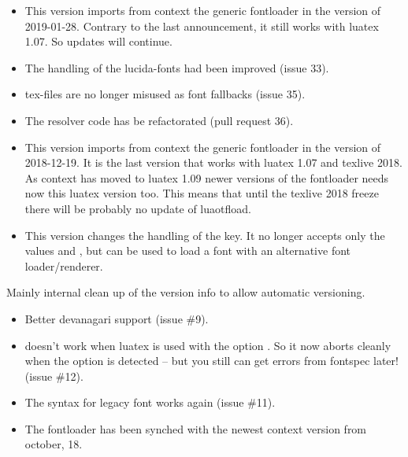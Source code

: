 \begin{itemize}
\item
This version imports from context the generic fontloader in the version of 2019-01-28. Contrary to the last announcement, it still works with luatex 1.07. So updates will continue.

\item The handling of the lucida-fonts had been improved (issue 33).

\item tex-files are no longer misused as font fallbacks (issue 35).

\item The resolver code has be refactorated (pull request 36).

\end{itemize}
\endsubsection
{}
\begin{itemize}
\item
This version imports from context the generic fontloader in the version of 2018-12-19. It is the last version that works with luatex 1.07 and texlive 2018. As context has moved to luatex 1.09 newer versions of the fontloader needs now this luatex version too. This means that until the texlive 2018 freeze there will be probably no update of luaotfload.

\item This version changes the handling of the  key. It no longer accepts only the values  and , but can be used to load a font with an alternative font loader/renderer.


\end{itemize}
\endsubsection

Mainly internal clean up of the version info to allow automatic versioning.
\endsubsection


\begin{itemize}

  \item Better devanagari support (issue \#9).
  \item {} doesn't work when luatex is used with the option . So it now aborts cleanly when the option is detected -- but you still can get errors from fontspec later! (issue \#12).
  \item  The syntax  for legacy font works again (issue \#11).
  \item The fontloader has been synched with the newest context version from october, 18.
\end{itemize}
\endsubsection
{}


